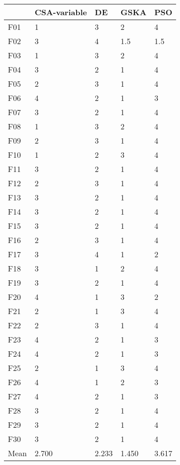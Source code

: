 \begin{tabular}{lllll}
\toprule
{} & CSA-variable &     DE &   GSKA &    PSO \\
\midrule
F01  &            1 &      3 &      2 &      4 \\
F02  &            3 &      4 &    1.5 &    1.5 \\
F03  &            1 &      3 &      2 &      4 \\
F04  &            3 &      2 &      1 &      4 \\
F05  &            2 &      3 &      1 &      4 \\
F06  &            4 &      2 &      1 &      3 \\
F07  &            3 &      2 &      1 &      4 \\
F08  &            1 &      3 &      2 &      4 \\
F09  &            2 &      3 &      1 &      4 \\
F10  &            1 &      2 &      3 &      4 \\
F11  &            3 &      2 &      1 &      4 \\
F12  &            2 &      3 &      1 &      4 \\
F13  &            3 &      2 &      1 &      4 \\
F14  &            3 &      2 &      1 &      4 \\
F15  &            3 &      2 &      1 &      4 \\
F16  &            2 &      3 &      1 &      4 \\
F17  &            3 &      4 &      1 &      2 \\
F18  &            3 &      1 &      2 &      4 \\
F19  &            3 &      2 &      1 &      4 \\
F20  &            4 &      1 &      3 &      2 \\
F21  &            2 &      1 &      3 &      4 \\
F22  &            2 &      3 &      1 &      4 \\
F23  &            4 &      2 &      1 &      3 \\
F24  &            4 &      2 &      1 &      3 \\
F25  &            2 &      1 &      3 &      4 \\
F26  &            4 &      1 &      2 &      3 \\
F27  &            4 &      2 &      1 &      3 \\
F28  &            3 &      2 &      1 &      4 \\
F29  &            3 &      2 &      1 &      4 \\
F30  &            3 &      2 &      1 &      4 \\
Mean &        2.700 &  2.233 &  1.450 &  3.617 \\
\bottomrule
\end{tabular}
